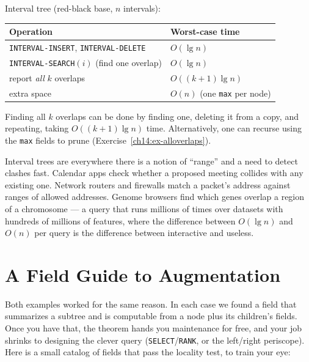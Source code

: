 \begin{complexitybox}
Interval tree (red-black base, $n$ intervals):
\begin{center}
\begin{tabular}{ll}
\toprule
Operation & Worst-case time \\
\midrule
\texttt{INTERVAL-INSERT}, \texttt{INTERVAL-DELETE} & $O(\lg n)$ \\
\texttt{INTERVAL-SEARCH}$(i)$ (find one overlap) & $O(\lg n)$ \\
report \emph{all} $k$ overlaps & $O((k+1) \lg n)$ \\
extra space & $O(n)$ (one \texttt{max} per node) \\
\bottomrule
\end{tabular}
\end{center}
Finding all $k$ overlaps can be done by finding one, deleting it from a copy,
and repeating, taking $O((k+1)\lg n)$ time. Alternatively, one can recurse using the
\texttt{max} fields to prune (Exercise~\ref{ch14:ex-alloverlaps}).
\end{complexitybox}

\begin{aestheticbox}
Interval trees are everywhere there is a notion of ``range'' and a need to detect
clashes fast. Calendar apps check whether a proposed meeting collides with any
existing one. Network routers and firewalls match a packet's address against
ranges of allowed addresses. Genome browsers find which genes overlap a region of
a chromosome --- a query that runs millions of times over datasets with hundreds
of millions of features, where the difference between $O(\lg n)$ and $O(n)$ per
query is the difference between interactive and useless.
\end{aestheticbox}

\section{A Field Guide to Augmentation}

Both examples worked for the same reason. In each case we found a field
that summarizes a subtree and is computable from a node plus its children's
fields. Once you have that, the theorem hands you maintenance for free, and your
job shrinks to designing the clever query (\texttt{SELECT}/\texttt{RANK}, or the
left/right periscope). Here is a small catalog of fields that pass the locality
test, to train your eye:

